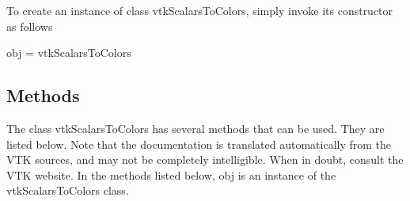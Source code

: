 To create an instance of class vtk\-Scalars\-To\-Colors, simply invoke its constructor as follows \begin{DoxyVerb}  obj = vtkScalarsToColors
\end{DoxyVerb}
 \hypertarget{vtkwidgets_vtkxyplotwidget_Methods}{}\subsection{Methods}\label{vtkwidgets_vtkxyplotwidget_Methods}
The class vtk\-Scalars\-To\-Colors has several methods that can be used. They are listed below. Note that the documentation is translated automatically from the V\-T\-K sources, and may not be completely intelligible. When in doubt, consult the V\-T\-K website. In the methods listed below, {\ttfamily obj} is an instance of the vtk\-Scalars\-To\-Colors class. 
